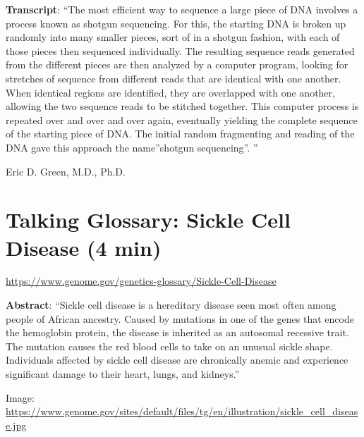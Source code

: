 \documentclass[
]{book}
\begin{document}
\textbf{Transcript}: ``The most efficient way to sequence a large piece of DNA involves a process known as shotgun sequencing. For this, the starting DNA is broken up randomly into many smaller pieces, sort of in a shotgun fashion, with each of those pieces then sequenced individually. The resulting sequence reads generated from the different pieces are then analyzed by a computer program, looking for stretches of sequence from different reads that are identical with one another. When identical regions are identified, they are overlapped with one another, allowing the two sequence reads to be stitched together. This computer process is repeated over and over and over again, eventually yielding the complete sequence of the starting piece of DNA. The initial random fragmenting and reading of the DNA gave this approach the name''shotgun sequencing''. ''

Eric D. Green, M.D., Ph.D.

\hypertarget{talking-glossary-sickle-cell-disease-4-min}{%
\section{Talking Glossary: Sickle Cell Disease (4 min)}\label{talking-glossary-sickle-cell-disease-4-min}}

\url{https://www.genome.gov/genetics-glossary/Sickle-Cell-Disease}

\textbf{Abstract}: ``Sickle cell disease is a hereditary disease seen most often among people of African ancestry. Caused by mutations in one of the genes that encode the hemoglobin protein, the disease is inherited as an autosomal recessive trait. The mutation causes the red blood cells to take on an unusual sickle shape. Individuals affected by sickle cell disease are chronically anemic and experience significant damage to their heart, lungs, and kidneys.''

Image: \url{https://www.genome.gov/sites/default/files/tg/en/illustration/sickle_cell_disease.jpg}
\end{document}
